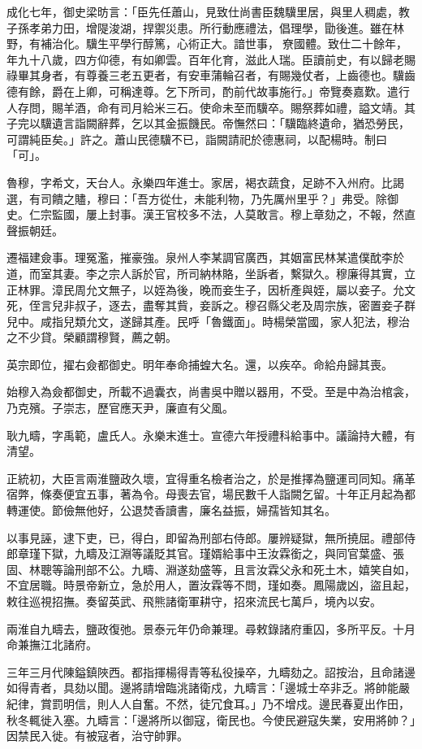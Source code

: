 \begin{pinyinscope}
成化七年，御史梁昉言：「臣先任蕭山，見致仕尚書臣魏驥里居，與里人稠處，教子孫孝弟力田，增隄浚湖，捍禦災患。所行動應禮法，倡理學，勖後進。雖在林野，有補治化。驥生平學行醇篤，心術正大。諳世事，尞國體。致仕二十餘年，年九十八歲，四方仰德，有如卿雲。百年化育，滋此人瑞。臣讀前史，有以歸老賜祿畢其身者，有尊養三老五更者，有安車蒲輪召者，有賜幾仗者，上齒德也。驥齒德有餘，爵在上卿，可稱達尊。乞下所司，酌前代故事施行。」帝覽奏嘉歎。遣行人存問，賜羊酒，命有司月給米三石。使命未至而驥卒。賜祭葬如禮，謚文靖。其子完以驥遺言詣闕辭葬，乞以其金振饑民。帝憮然曰：「驥臨終遺命，猶恐勞民，可謂純臣矣。」許之。蕭山民德驥不已，詣闕請祀於德惠祠，以配楊時。制曰「可」。

魯穆，字希文，天台人。永樂四年進士。家居，褐衣蔬食，足跡不入州府。比謁選，有司饋之贐，穆曰：「吾方從仕，未能利物，乃先厲州里乎？」弗受。除御史。仁宗監國，屢上封事。漢王官校多不法，人莫敢言。穆上章劾之，不報，然直聲振朝廷。

遷福建僉事。理冤濫，摧豪強。泉州人李某調官廣西，其姻富民林某遣僕酖李於道，而室其妻。李之宗人訴於官，所司納林賂，坐訴者，繫獄久。穆廉得其實，立正林罪。漳民周允文無子，以姪為後，晚而妾生子，因析產與姪，屬以妾子。允文死，侄言兒非叔子，逐去，盡奪其貲，妾訴之。穆召縣父老及周宗族，密置妾子群兒中。咸指兒類允文，遂歸其產。民呼「魯鐵面」。時楊榮當國，家人犯法，穆治之不少貸。榮顧謂穆賢，薦之朝。

英宗即位，擢右僉都御史。明年奉命捕蝗大名。還，以疾卒。命給舟歸其喪。

始穆入為僉都御史，所載不過囊衣，尚書吳中贈以器用，不受。至是中為治棺衾，乃克殯。子崇志，歷官應天尹，廉直有父風。

耿九疇，字禹範，盧氏人。永樂末進士。宣德六年授禮科給事中。議論持大體，有清望。

正統初，大臣言兩淮鹽政久壞，宜得重名檢者治之，於是推擇為鹽運司同知。痛革宿弊，條奏便宜五事，著為令。母喪去官，場民數千人詣闕乞留。十年正月起為都轉運使。節儉無他好，公退焚香讀書，廉名益振，婦孺皆知其名。

以事見誣，逮下吏，已，得白，即留為刑部右侍郎。屢辨疑獄，無所撓屈。禮部侍郎章瑾下獄，九疇及江淵等議貶其官。瑾婿給事中王汝霖銜之，與同官葉盛、張固、林聰等論刑部不公。九疇、淵遂劾盛等，且言汝霖父永和死土木，嬉笑自如，不宜居職。時景帝新立，急於用人，置汝霖等不問，瑾如奏。鳳陽歲凶，盜且起，敕往巡視招撫。奏留英武、飛熊諸衛軍耕守，招來流民七萬戶，境內以安。

兩淮自九疇去，鹽政復弛。景泰元年仍命兼理。尋敕錄諸府重囚，多所平反。十月命兼撫江北諸府。

三年三月代陳鎰鎮陜西。都指揮楊得青等私役操卒，九疇劾之。詔按治，且命諸邊如得青者，具劾以聞。邊將請增臨洮諸衛戍，九疇言：「邊城士卒非乏。將帥能嚴紀律，賞罰明信，則人人自奮。不然，徒冗食耳。」乃不增戍。邊民春夏出作田，秋冬輒徙入塞。九疇言：「邊將所以御寇，衛民也。今使民避寇失業，安用將帥？」因禁民入徙。有被寇者，治守帥罪。


\end{pinyinscope}
